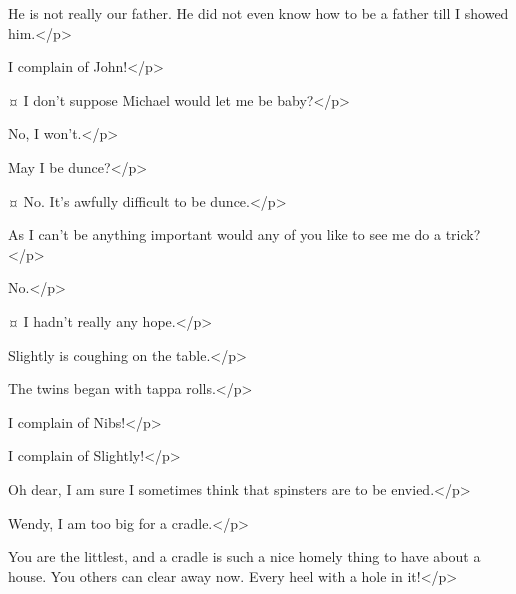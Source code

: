 \johnspeaks
He is not really our father.
He did not even know how to be a father till I showed him.</p>


\secondtwinspeaks
I complain of John!</p>


\tootlesspeaks {}¤
I don't suppose Michael would let me be baby?</p>

\michaelspeaks
No, I won't.</p>

\tootlesspeaks
May I be dunce?</p>

\firsttwinspeaks {}¤
No.
It's awfully difficult to be dunce.</p>

\tootlesspeaks
As I can't be anything important would any of you like to see me do a trick?</p>

No.</p>

\tootlesspeaks {}¤
I hadn't really any hope.</p>


\nibsspeaks
Slightly is coughing on the table.</p>

\curlyspeaks
The twins began with tappa rolls.</p>

\slightlyspeaks
I complain of Nibs!</p>

\nibsspeaks
I complain of Slightly!</p>

\wendyspeaks
Oh dear, I am sure I sometimes think that spinsters are to be envied.</p>

\michaelspeaks
Wendy, I am too big for a cradle.</p>

\wendyspeaks
You are the littlest, and a cradle is such a nice homely thing to have about a house.
You others can clear away now.
Every heel with a hole in it!</p>

